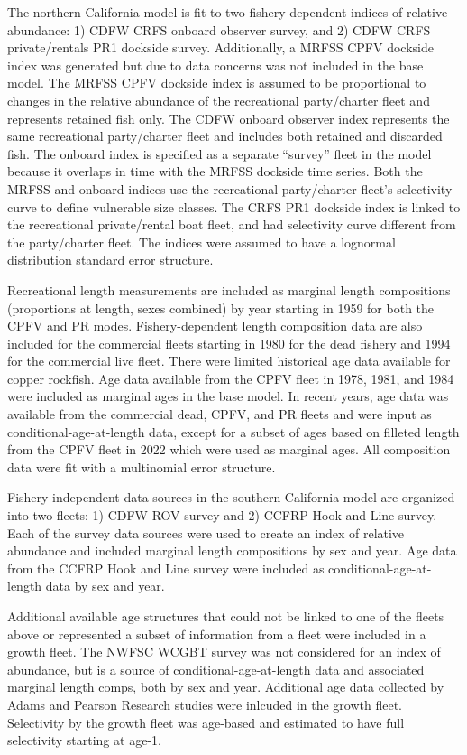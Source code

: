 \documentclass[11pt,
  english,
  letterpaper,
]{article}
\begin{document}
The northern California model is fit to two fishery-dependent indices of relative abundance: 1) CDFW CRFS onboard observer survey, and 2) CDFW CRFS private/rentals PR1 dockside survey. Additionally, a MRFSS CPFV dockside index was generated but due to data concerns was not included in the base model. The MRFSS CPFV dockside index is assumed to be proportional to changes in the relative abundance of the recreational party/charter fleet and represents retained fish only. The CDFW onboard observer index represents the same recreational party/charter fleet and includes both retained and discarded fish. The onboard index is specified as a separate ``survey'' fleet in the model because it overlaps in time with the MRFSS dockside time series. Both the MRFSS and onboard indices use the recreational party/charter fleet's selectivity curve to define vulnerable size classes. The CRFS PR1 dockside index is linked to the recreational private/rental boat fleet, and had selectivity curve different from the party/charter fleet. The indices were assumed to have a lognormal distribution standard error structure.

Recreational length measurements are included as marginal length compositions (proportions at length, sexes combined) by year starting in 1959 for both the CPFV and PR modes. Fishery-dependent length composition data are also included for the commercial fleets starting in 1980 for the dead fishery and 1994 for the commercial live fleet. There were limited historical age data available for copper rockfish. Age data available from the CPFV fleet in 1978, 1981, and 1984 were included as marginal ages in the base model. In recent years, age data was available from the commercial dead, CPFV, and PR fleets and were input as conditional-age-at-length data, except for a subset of ages based on filleted length from the CPFV fleet in 2022 which were used as marginal ages. All composition data were fit with a multinomial error structure.

Fishery-independent data sources in the southern California model are organized into two fleets: 1) CDFW ROV survey and 2) CCFRP Hook and Line survey. Each of the survey data sources were used to create an index of relative abundance and included marginal length compositions by sex and year. Age data from the CCFRP Hook and Line survey were included as conditional-age-at-length data by sex and year.

Additional available age structures that could not be linked to one of the fleets above or represented a subset of information from a fleet were included in a growth fleet. The NWFSC WCGBT survey was not considered for an index of abundance, but is a source of conditional-age-at-length data and associated marginal length comps, both by sex and year. Additional age data collected by Adams and Pearson Research studies were inlcuded in the growth fleet. Selectivity by the growth fleet was age-based and estimated to have full selectivity starting at age-1.
\end{document}
